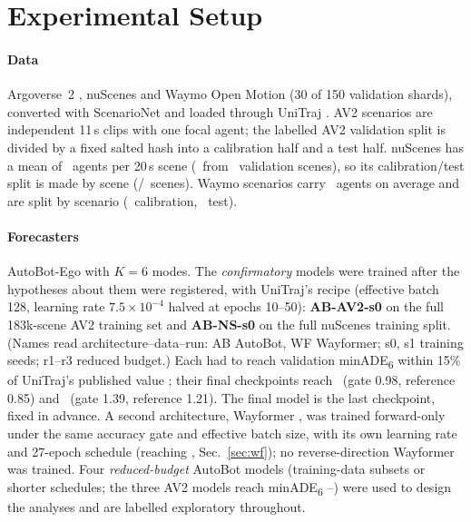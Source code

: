 \section{Experimental Setup}\label{sec:setup}
\paragraph{Data} Argoverse~2 \cite{wilson2021argoverse2}, nuScenes \cite{caesar2020nuscenes} and Waymo Open Motion
\cite{ettinger2021waymo} (30 of 150 validation shards), converted with ScenarioNet \cite{li2023scenarionet} and loaded
through UniTraj \cite{feng2024unitraj}. AV2 scenarios are independent 11\,s clips with one focal agent; the labelled AV2
validation split is divided by a fixed salted hash into a calibration half and a test half. nuScenes has a mean of \nsAgentsMean\ agents per
20\,s scene (\nsNAgents\ from \nsNScenes\ validation scenes), so its calibration/test split is made by scene (\nsNScenesCal/\nsNScenesTest\ scenes). Waymo
scenarios carry \wmAgentsPerScenario\ agents on average and are split by scenario (\wmNScenariosCalAvW\ calibration, \wmNScenariosAvW\ test).
\paragraph{Forecasters} AutoBot-Ego \cite{girgis2022autobots} with $K=6$ modes. The \emph{confirmatory} models were trained
after the hypotheses about them were registered, with UniTraj's recipe (effective batch 128, learning rate
$7.5\times10^{-4}$ halved at epochs 10--50): \textbf{AB-AV2-s0} on the full 183k-scene AV2 training set and
\textbf{AB-NS-s0} on the full nuScenes training split. (Names read architecture--data--run: AB AutoBot, WF Wayformer; s0, s1 training seeds; r1--r3 reduced budget.) Each had to reach validation minADE\textsubscript{6} within
15\% of UniTraj's published value \cite{feng2024unitraj}; their final checkpoints reach \minADESixConf\ (gate 0.98, reference 0.85) and
\minADESixConfRev\ (gate 1.39, reference 1.21). The final model is the last checkpoint, fixed in advance. A second
architecture, Wayformer \cite{nayakanti2023wayformer}, was trained forward-only under the same accuracy gate and effective batch size, with its own learning rate and 27-epoch schedule
(reaching \minADESixWayformer, Sec.~\ref{sec:wf}); no reverse-direction Wayformer was trained. Four
\emph{reduced-budget} AutoBot models (training-data subsets or shorter schedules; the three AV2 models reach
minADE\textsubscript{6} \explAdeMin--\explAdeMax) were used to design the analyses and are labelled exploratory throughout.
